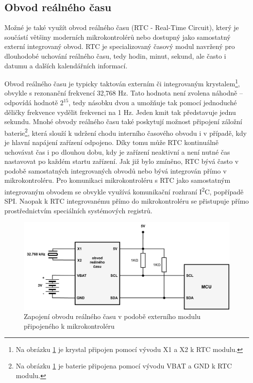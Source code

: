 \subsection{Obvod reálného času}
\label{real_time_circuit}
Možné je také využít obvod reálného času (RTC - Real-Time Circuit), který je součástí většiny moderních mikrokontrolérů nebo dostupný jako samostatný externí integrovaný obvod. RTC je specializovaný časový modul navržený pro dlouhodobé uchování reálného času, tedy hodin, minut, sekund, ale často i datumu a dalších kalendářních informací.

Obvod reálného času je typicky taktován externím či integrovaným krystalem\footnote{Na obrázku \ref{fig:real-time-circuit} je krystal připojen pomocí vývodu X1 a X2 k RTC modulu.}, obvykle s rezonanční frekvencí 32,768 Hz. Tato hodnota není zvolena náhodně – odpovídá hodnotě $2^{15}$, tedy násobku dvou a umožňuje tak pomocí jednoduché děličky frekvence vydělit frekvenci na 1 Hz. Jeden kmit tak představuje jednu sekundu. Mnohé obvody reálného času také poskytují možnost připojení záložní baterie\footnote{Na obrázku \ref{fig:real-time-circuit} je baterie připojena pomocí vývodu VBAT a GND k RTC modulu.}, která slouží k udržení chodu interního časového obvodu i v případě, kdy je hlavní napájení zařízení odpojeno. Díky tomu může RTC kontinuálně uchovávat čas i po dlouhou dobu, kdy je zařízení neaktivní a není nutné čas nastavovat po každém startu zařízení. Jak již bylo zmíněno, RTC bývá často v podobě samostatných integrovaných obvodů nebo bývá integrován přímo v mikrokontroléru. Pro komunikaci mikrokontroléru s RTC jako samostatným integrovaným obvodem se obvykle využívá komunikační rozhraní I\textsuperscript{2}C, popřípadě SPI. Naopak k RTC integrovanému přímo do mikrokontroléru se přistupuje přímo prostřednictvím speciálních systémových registrů. \cite{jameco_choosing_right_real_time_clock_chip_or_module, yxc_role_of_32768_freq_in_the_circuit, medium_rtc}

\newpage

\begin{figure}[h]
    \centering
    \includegraphics[width=1.00\textwidth]{obrazky-figures/real_time_circuit.pdf}
    
    \caption{Zapojení obvodu reálného času v podobě externího modulu připojeného k mikrokontroléru \cite{embed_journal_interfacing_rtc_with_microcontroler}}
    \label{fig:real-time-circuit}
\end{figure}

